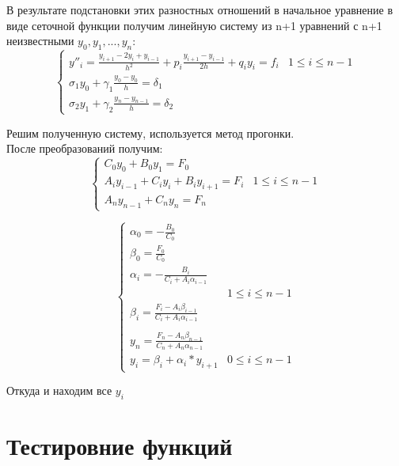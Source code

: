 \documentclass[a4paper,12pt,titlepage,finall]{article}
\begin{document}
В результате подстановки этих разностных отношений в начальное уравнение в виде сеточной функции получим линейную систему из n+1 уравнений с n+1 неизвестными $y_0, y_1,...,y_n$:\\
\begin{equation*}
\begin{cases}
y''_{i}=\frac{y_{i+1}-2y_{i}+y_{i-1}}{h^{2}} + p_{i}\frac{y_{i+1}-y_{i-1}}{2h} + q_{i}y_{i} = f_{i} & 1 \leq i \leq n-1\\
\sigma_{1}y_{0} + \gamma_{1}\frac{y_{0}  -y_{0}}{h}= \delta_{1}\\
\sigma_{2}y_{1} + \gamma_{2}\frac{y_{n}  -y_{n-1}}{h}= \delta_{2}
\end{cases}
\end{equation*}

\newpage

Решим полученную систему, используется метод прогонки. \\
После преобразований получим:
\begin{equation*}
\begin{cases}
C_{0}y_{0} + B_{0}y_{1}=F_{0}\\
A_{i}y_{i-1}+C_{i}y_{i} + B_{i}y_{i+1}=F_{i} & 1 \leq i \leq n-1 \\
A_{n}y_{n-1} + C_{n}y_{n}=F_{n}
\end{cases}
\end{equation*}

\bigskip
\begin{minipage}{\linewidth}
\begin{equation*}
\begin{cases}
\alpha_{0}=-\frac{B_{0}}{C_{0}}\\
\beta_{0}=\frac{F_{0}}{C_{0}}\\
\alpha_{i}=-\frac{B_{i}}{C_{i} + A_{i}\alpha_{i-1}}\\
& 1 \leq i \leq n-1\\
\beta_{i}=\frac{F_{i} - A_{i}\beta_{i-1}}{C_{i} + A_{i}\alpha_{i-1}}\\
\\
y_{n}=\frac{F_{n} - A_{n}\beta_{n-1}}{C_{n} + A_{n}\alpha_{n-1}}\\
y_{i}=\beta_{i}+\alpha_{i} *y_{i+1} & 0 \leq i \leq n-1
\end{cases}
\end{equation*}
\end{minipage}
Откуда и находим все $y_{i}$
\newpage

\section{Тестировние функций}
\end{document}
